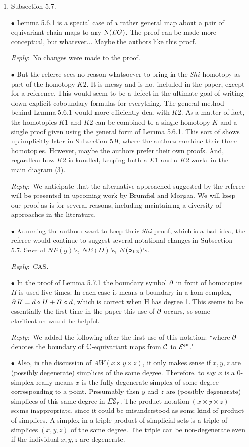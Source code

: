 \documentclass{amsart}
\newcommand{\ar}{\medskip\noindent\textit{Reply}:\ }
\def\subitem{\medskip\noindent$\bullet$ }
\begin{document}
\begin{enumerate}
	\ar CAS.

	\item Subsection 5.7.

	\subitem Lemma 5.6.1 is a special case of a rather general map about a pair
	of equivariant chain maps to any $\operatorname{N}(EG)$.
	The proof can be made more conceptual, but whatever... Maybe the authors like this proof.

	\ar No changes were made to the proof.

	\subitem But the referee sees no reason whatsoever to bring in the $Shi$ homotopy as part of the homotopy $K2$.
	It is messy and is not included in the paper, except for a reference.
	This would seem to be a defect in the ultimate goal of writing down explicit coboundary formulas for everything. The general method behind Lemma 5.6.1 would more efficiently deal with $K2$.
	As a matter of fact, the homotopies $K1$ and $K2$ can be combined to a single homotopy $K$ and a single proof given using the general form of Lemma 5.6.1.
	This sort of shows up implicitly later in Subsection 5.9, where the authors combine their three homotopies. However, maybe the authors prefer their own proofs.
	And, regardless how $K2$ is handled, keeping both a $K1$ and a $K2$ works in the main
	diagram (3).

	\ar We anticipate that the alternative approached suggested by the referee will be presented in upcoming work by Brumfiel and Morgan.
	We will keep our proof as is for several reasons, including maintaining a diversity of approaches in the literature.

	\subitem Assuming the authors want to keep their $Shi$ proof, which is a bad idea, the referee
	would continue to suggest several notational changes in Subsection 5.7. Several $N E(g)$’s,
	$N E(D)$’s, $N(\bm{\mathbin{\circ}}_{\operatorname{E}\mathbb{S}})$’s.

	\ar CAS.

	\subitem In the proof of Lemma 5.7.1 the boundary symbol $\operatorname{\partial}$ in front of homotopies $H$ is used five times.
	In each case it means a boundary in a hom complex, $\operatorname{\partial} H = d \mathbin{\circ} H + H \mathbin{\circ} d$, which is
	correct when H has degree 1.
	This seems to be essentially the first time in the paper this
	use of $\operatorname{\partial}$ occurs, so some clarification would be helpful.

	\ar We added the following after the first use of this notation: ``where $\operatorname{\partial}$ denotes the boundary of $\mathbb{C}$-equivariant maps from $\mathcal{C}$ to $\mathcal{E}^{\mathrm{ev}}$."

	\subitem Also, in the discussion of $AW(x \times y \times z)$, it only makes sense if $x, y, z$ are (possibly degenerate) simplices of the same degree.
	Therefore, to say $x$ is a 0-simplex really means $x$ is the fully degenerate simplex of some degree corresponding to a point.
	Presumably then $y$ and $z$ are (possibly degenerate) simplices of this same degree in $E\mathbb{S}_r$. The product notation $(x \times y \times z)$ seems inappropriate, since it could be misunderstood as some kind of product of simplices.
	A simplex in a triple product of simplicial sets is a triple of simplices $(x, y, z)$ of the same degree.
	The triple can be non-degenerate even if the individual $x, y, z$ are degenerate.


\end{enumerate}
\end{document}
